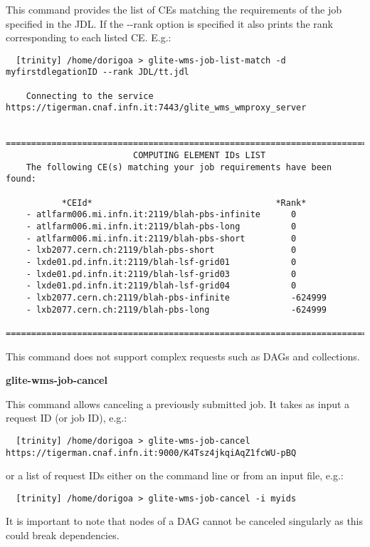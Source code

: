   This command provides the list of CEs matching the requirements of the job specified in the JDL. If the 
  -{}-rank  option is specified it also prints the rank corresponding to each listed CE. E.g.:
\begin{scriptsize}
\begin{verbatim}
  [trinity] /home/dorigoa > glite-wms-job-list-match -d myfirstdlegationID --rank JDL/tt.jdl 

    Connecting to the service https://tigerman.cnaf.infn.it:7443/glite_wms_wmproxy_server

    ==========================================================================
                         COMPUTING ELEMENT IDs LIST 
    The following CE(s) matching your job requirements have been found:

           *CEId*                                    *Rank*
    - atlfarm006.mi.infn.it:2119/blah-pbs-infinite      0
    - atlfarm006.mi.infn.it:2119/blah-pbs-long          0
    - atlfarm006.mi.infn.it:2119/blah-pbs-short         0
    - lxb2077.cern.ch:2119/blah-pbs-short               0
    - lxde01.pd.infn.it:2119/blah-lsf-grid01            0
    - lxde01.pd.infn.it:2119/blah-lsf-grid03            0
    - lxde01.pd.infn.it:2119/blah-lsf-grid04            0
    - lxb2077.cern.ch:2119/blah-pbs-infinite            -624999
    - lxb2077.cern.ch:2119/blah-pbs-long                -624999
    ==========================================================================
\end{verbatim}
\end{scriptsize}
  This command does not support complex requests such as DAGs and collections.



\textbf{glite-wms-job-cancel}

  This command allows canceling a previously submitted job. It takes as input a request ID (or job ID), e.g.:
\begin{scriptsize}
\begin{verbatim}
  [trinity] /home/dorigoa > glite-wms-job-cancel  https://tigerman.cnaf.infn.it:9000/K4Tsz4jkqiAqZ1fcWU-pBQ
\end{verbatim}
\end{scriptsize}
  or a list of request IDs either on the command line or from an input file, e.g.:
\begin{scriptsize}
\begin{verbatim}
  [trinity] /home/dorigoa > glite-wms-job-cancel -i myids
\end{verbatim}
\end{scriptsize}
  It is important to note that nodes of a DAG cannot be canceled singularly as this could break dependencies.


